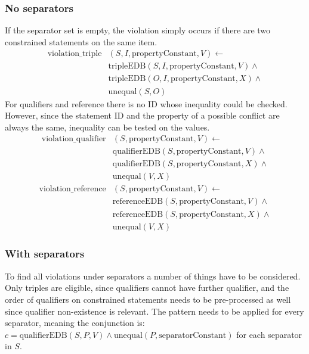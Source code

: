 \documentclass[hyperref,bachelorofscience,fleqn]{cgvpub}
\begin{document}
\subsubsection{No separators}
If the separator set is empty, the violation simply occurs if there are two constrained statements on the same item. 
\begin{equation}\label{eq_no_separators_triple}
\begin{split}
\text{violation\_triple}&(S, I, \text{propertyConstant}, V) \leftarrow \\
&\text{tripleEDB}(S, I, \text{propertyConstant}, V) \wedge \\
&\text{tripleEDB}(O, I, \text{propertyConstant}, X) \wedge \\
&\text{unequal}(S, O)
\end{split}
\end{equation}
For qualifiers and reference there is no ID whose inequality could be checked. However, since the statement ID and the property of a possible conflict are always the same, inequality can be tested on the values.
\begin{equation*}
\begin{split}
\text{violation\_qualifier}&(S, \text{propertyConstant}, V) \leftarrow \\
&\text{qualifierEDB}(S, \text{propertyConstant}, V) \wedge \\
&\text{qualifierEDB}(S, \text{propertyConstant}, X) \wedge \\
&\text{unequal}(V, X)
\end{split}
\end{equation*}
\begin{equation*}
\begin{split}
\text{violation\_reference}&(S, \text{propertyConstant}, V) \leftarrow \\
&\text{referenceEDB}(S, \text{propertyConstant}, V) \wedge \\
&\text{referenceEDB}(S, \text{propertyConstant}, X) \wedge \\
&\text{unequal}(V, X)
\end{split}
\end{equation*}

\subsubsection{With separators}\label{subsubsec_with_separators}
To find all violations under separators a number of things have to be considered. Only triples are eligible, since qualifiers cannot have further qualifier, and the order of qualifiers on constrained statements needs to be pre-processed as well since qualifier non-existence is relevant. The pattern needs to be applied for every separator, meaning the conjunction is: \(c = \text{qualifierEDB}(S, P, V) \wedge \text{unequal}(P, \text{separatorConstant})\) for each separator in \(S\).\\
\end{document}

